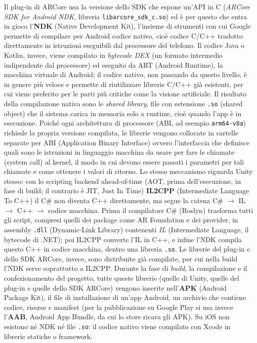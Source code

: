 Il plug-in di ARCore usa la versione dello SDK che espone un'API in C (\textit{ARCore SDK for Android NDK}, libreria \texttt{libarcore\_sdk\_c.so}) ed è per questo che entra in gioco l'\textbf{NDK}\cite{NDK} (Native Development Kit), l'insieme di strumenti con cui Google permette di compilare per Android codice nativo, cioè codice C/C++ tradotto direttamente in istruzioni eseguibili dal processore del telefono. Il codice Java o Kotlin, invece, viene compilato in \textit{bytecode DEX} (un formato intermedio indipendente dal processore) ed eseguito da ART (Android Runtime), la macchina virtuale di Android; il codice nativo, non passando da questo livello, è in genere più veloce e permette di riutilizzare librerie C/C++ già esistenti, per cui viene preferito per le parti più critiche come la visione artificiale. Il risultato della compilazione nativa sono le \textit{shared library}, file con estensione \texttt{.so} (shared object) che il sistema carica in memoria solo a runtime, cioè quando l'app è in esecuzione. Poiché ogni architettura di processore (ABI, ad esempio \texttt{arm64-v8a}) richiede la propria versione compilata, le librerie vengono collocate in cartelle separate per ABI (Application Binary Interface) ovvero l'interfaccia che definisce quali sono le istruzioni in linguaggio macchina da usare per fare le chiamate (system call) al kernel, il modo in cui devono essere passati i parametri per tali chiamate e come ottenere i valori di ritorno. Lo stesso meccanismo riguarda Unity stesso: con lo scripting backend ahead-of-time (AOT, prima dell'esecuzione, in fase di build; il contrario è JIT, Just In Time) \textbf{IL2CPP} (Intermediate Language To C++) il C\# non diventa C++ direttamente, ma segue la catena C\# $\rightarrow$ IL $\rightarrow$ C++ $\rightarrow$ codice macchina. Prima il compilatore C\# (Roslyn) trasforma tutti gli script, compresi quelli dei package come AR Foundation e dei provider, in assembly \texttt{.dll} (Dynamic-Link Library) contenenti \textit{IL} (Intermediate Language, il bytecode di .NET); poi IL2CPP converte l'IL in C++, e infine l'NDK compila questo C++ in codice macchina, dentro una libreria \texttt{.so}. Le librerie del plug-in e dello SDK ARCore, invece, sono distribuite già compilate, per cui nella build l'NDK serve soprattutto a IL2CPP. Durante la fase di \textit{build}, la compilazione e il confezionamento del progetto, tutte queste librerie (quelle di Unity, quelle del plug-in e quelle dello SDK ARCore) vengono inserite nell'\textbf{APK} (Android Package Kit), il file di installazione di un'app Android, un archivio che contiene codice, risorse e manifest (per la pubblicazione su Google Play si usa invece l'\textbf{AAB}, Android App Bundle, da cui lo store ricava gli APK). Su iOS non esistono né NDK né file \texttt{.so}: il codice nativo viene compilato con Xcode in librerie statiche o framework.

